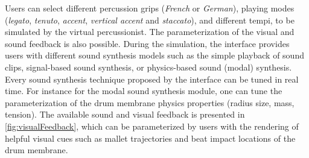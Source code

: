 Users can select different percussion grips (\emph{French} or \emph{German}), playing modes (\emph{legato}, \emph{tenuto}, \emph{accent}, \emph{vertical accent} and \emph{staccato}), and different tempi, to be simulated by the virtual percussionist. The parameterization of the visual and sound feedback is also possible. During the simulation, the interface provides users with different sound synthesis models such as the simple playback of sound clips, signal-based sound synthesis, or physics-based sound (modal) synthesis. Every sound synthesis technique proposed by the interface can be tuned in real time. For instance for the modal sound synthesis module, one can tune the parameterization of the drum membrane physics properties (radius size, mass, tension). The available sound and visual feedback is presented in \myfigname \ref{fig:visualFeedback}, which can be parameterized by users with the rendering of helpful visual cues such as mallet trajectories and beat impact locations of the drum membrane.

